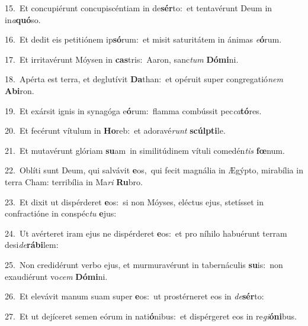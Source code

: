 {\numbfont\textcolor{\numbcolor}{15.}}~Et concupiérunt concupiscéntiam in de\-\textbf{sér}\-to:~\star et tentavérunt Deum in in\-\textit{a}\-\textbf{quó}so.\par
{\numbfont\textcolor{\numbcolor}{16.}}~Et dedit eis petitiónem ip\-\textbf{só}\-rum:~\star et misit saturitátem in ánimas \textit{e}\-\textbf{ó}rum.\par
{\numbfont\textcolor{\numbcolor}{17.}}~Et irritavérunt Móysen in \textbf{cas}\-tris:~\star Aaron, sanc\textit{tum} \textbf{Dó}\-\textbf{mi}ni.\par
{\numbfont\textcolor{\numbcolor}{18.}}~Apérta est terra, et deglutívit \textbf{Da}\-than:~\star et opéruit super congregatió\textit{nem} \textbf{Ab}\-\textbf{i}ron.\par
{\numbfont\textcolor{\numbcolor}{19.}}~Et exársit ignis in synagóga e\-\textbf{ó}\-rum:~\star flamma combússit pec\-\textit{ca}\-\textbf{tó}res.\par
{\numbfont\textcolor{\numbcolor}{20.}}~Et fecérunt vítulum in \textbf{Ho}\-reb:~\star et adoravé\textit{runt} \textbf{scúlp}\-\textbf{ti}le.\par
{\numbfont\textcolor{\numbcolor}{21.}}~Et mutavérunt glóriam \textbf{su}\-am~\star in similitúdinem vítuli comedén\textit{tis} \textbf{fœ}\-num.\par
{\numbfont\textcolor{\numbcolor}{22.}}~Oblíti sunt Deum, qui salvávit \textbf{e}\-os,~\star qui fecit magnália in Ægýpto, mirabília in terra Cham: terribília in Ma\textit{ri} \textbf{Ru}\-bro.\par
{\numbfont\textcolor{\numbcolor}{23.}}~Et dixit ut dispérderet \textbf{e}\-os:~\star si non Móyses, eléctus ejus, stetísset in confractióne in conspéc\textit{tu} \textbf{e}\-jus:\par
{\numbfont\textcolor{\numbcolor}{24.}}~Ut avérteret iram ejus ne dispérderet \textbf{e}\-os:~\star et pro níhilo habuérunt terram desi\-\textit{de}\-\textbf{rá}\textbf{bi}lem:\par
{\numbfont\textcolor{\numbcolor}{25.}}~Non credidérunt verbo ejus, et murmuravérunt in tabernáculis \textbf{su}\-is:~\star non exaudiérunt vo\textit{cem} \textbf{Dó}\-\textbf{mi}ni.\par
{\numbfont\textcolor{\numbcolor}{26.}}~Et elevávit manum suam super \textbf{e}\-os:~\star ut prostérneret eos in \textit{de}\-\textbf{sér}to:\par
{\numbfont\textcolor{\numbcolor}{27.}}~Et ut dejíceret semen eórum in nati\-\textbf{ó}\-nibus:~\star et dispérgeret eos in re\-\textit{gi}\-\textbf{ó}\textbf{ni}bus.\par
